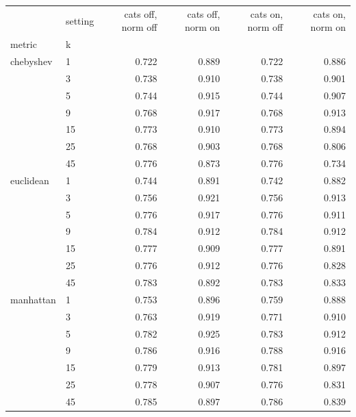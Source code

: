 \begin{tabular}{llrrrr}
\toprule
 & setting & cats off, norm off & cats off, norm on & cats on, norm off & cats on, norm on \\
metric & k &  &  &  &  \\
\midrule
chebyshev & 1 & 0.722 & 0.889 & 0.722 & 0.886 \\
 & 3 & 0.738 & 0.910 & 0.738 & 0.901 \\
 & 5 & 0.744 & 0.915 & 0.744 & 0.907 \\
 & 9 & 0.768 & 0.917 & 0.768 & 0.913 \\
 & 15 & 0.773 & 0.910 & 0.773 & 0.894 \\
 & 25 & 0.768 & 0.903 & 0.768 & 0.806 \\
 & 45 & 0.776 & 0.873 & 0.776 & 0.734 \\
euclidean & 1 & 0.744 & 0.891 & 0.742 & 0.882 \\
 & 3 & 0.756 & 0.921 & 0.756 & 0.913 \\
 & 5 & 0.776 & 0.917 & 0.776 & 0.911 \\
 & 9 & 0.784 & 0.912 & 0.784 & 0.912 \\
 & 15 & 0.777 & 0.909 & 0.777 & 0.891 \\
 & 25 & 0.776 & 0.912 & 0.776 & 0.828 \\
 & 45 & 0.783 & 0.892 & 0.783 & 0.833 \\
manhattan & 1 & 0.753 & 0.896 & 0.759 & 0.888 \\
 & 3 & 0.763 & 0.919 & 0.771 & 0.910 \\
 & 5 & 0.782 & 0.925 & 0.783 & 0.912 \\
 & 9 & 0.786 & 0.916 & 0.788 & 0.916 \\
 & 15 & 0.779 & 0.913 & 0.781 & 0.897 \\
 & 25 & 0.778 & 0.907 & 0.776 & 0.831 \\
 & 45 & 0.785 & 0.897 & 0.786 & 0.839 \\
\bottomrule
\end{tabular}
